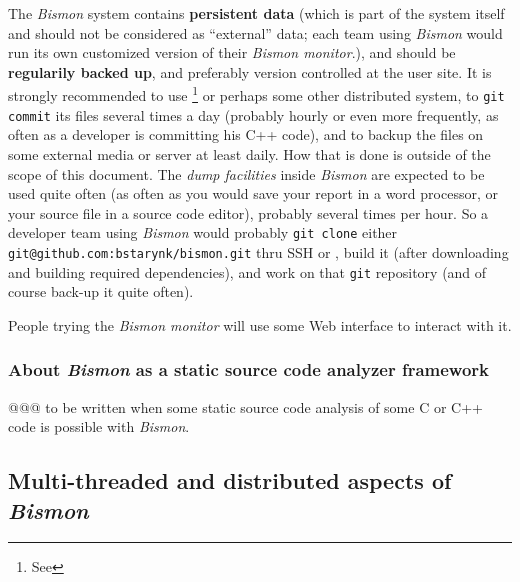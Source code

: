 The \textit{Bismon} system contains \textbf{persistent data} (which is
part of the system itself and should not be considered as ``external''
data; each team using \textit{Bismon} would run its own customized
version of their \textit{Bismon monitor}.), and should be
\textbf{regularily backed up}, and preferably version controlled at
the user site. It is strongly recommended to use
 \footnote{See }
or perhaps some other distributed  system, to \texttt{git commit} its files several times a
day (probably hourly or even more frequently, as often as a developer
is committing his C++ code), and to backup the files on some external
media or server at least daily. How that is done is outside of the
scope of this document. The \emph{dump facilities} inside
\textit{Bismon} are expected to be used quite often (as often as you
would save your report in a word processor, or your source file in a
source code editor), probably several times per hour. So a developer
team using \textit{Bismon} would probably \texttt{git clone} either
\texttt{git@github.com:bstarynk/bismon.git} thru SSH or
, build it (after
downloading and building required dependencies), and work on that
\texttt{git} repository (and of course back-up it quite often).

People trying the \emph{Bismon monitor} will use some Web interface to
interact with it.

\subsubsection{About \emph{Bismon} as a static source code analyzer framework}

@@@ to be written when some static source code analysis of some C or
C++ code is possible with \emph{Bismon}.


\subsection{Multi-threaded and distributed aspects of \textit{Bismon}}

